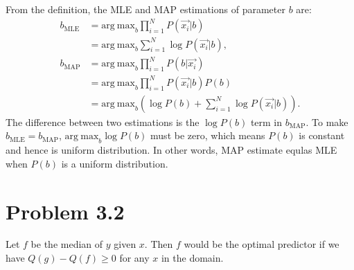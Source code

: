 \documentclass[twoside,11pt]{homework}
\begin{document}
From the definition, the MLE and MAP estimations of parameter $b$ are:
\begin{equation}
\begin{split}
b_{\mathrm{MLE}} &= \mathrm{arg\ max}_b \prod_{i=1}^N P(\overrightarrow{x_i}|b) \\
			   &= \mathrm{arg\ max}_b \sum_{i=1}^N \log P(\overrightarrow{x_i}|b) , \\
b_{\mathrm{MAP}} &= \mathrm{arg\ max}_b \prod_{i=1}^N P(b|\overrightarrow{x_i}) \\
                                   & = \mathrm{arg\ max}_b \prod_{i=1}^N P(\overrightarrow{x_i}|b) P(b) \\
                                   &= \mathrm{arg\ max}_b (\log P(b) + \sum_{i=1}^N \log P(\overrightarrow{x_i}|b)).
\end{split}
\end{equation}
The difference between two estimations is the $\log P(b)$ term in $b_{\mathrm{MAP}}$.
To make $b_{\mathrm{MLE}} = b_{\mathrm{MAP}}$, $\mathrm{arg\ max}_b \log P(b) $ must be zero, which means $P(b)$ is constant and hence is uniform distribution.
In other words, MAP estimate equlas MLE when $P(b)$ is a uniform distribution.

\section*{Problem 3.2}
Let $f$ be the median of $y$ given $x$.
Then $f$ would be the optimal predictor if we have $Q(g) - Q(f) \ge 0$ for any $x$ in the domain.
\end{document}
